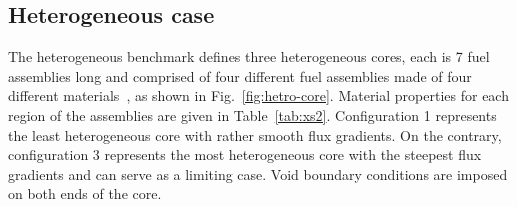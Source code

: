 \subsection{Heterogeneous case}
\label{subsec:heterog}

The heterogeneous benchmark defines three heterogeneous cores, each is 7 fuel assemblies long and comprised of four different fuel assemblies made of four different materials~\cite{Rahnema-1997}, as shown in Fig.~\ref{fig:hetro-core}. Material properties for each region of the assemblies are given in Table~\ref{tab:xs2}. Configuration 1 represents the least heterogeneous core with rather smooth flux gradients. On the contrary, configuration 3 represents the most heterogeneous core with the steepest flux gradients and can serve as a limiting case. Void boundary conditions are imposed on both ends of the core. 


